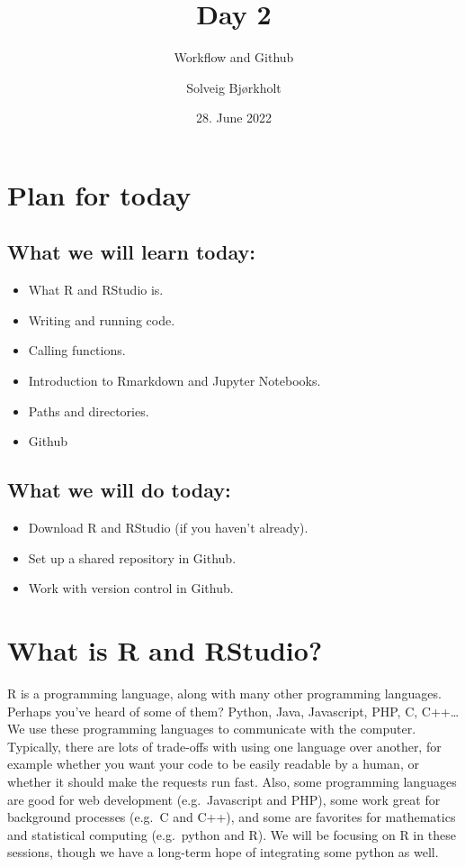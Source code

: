 \documentclass[
]{article}
\title{Day 2}
\subtitle{Workflow and Github}
\author{Solveig Bjørkholt}
\date{28. June 2022}
\providecommand{\tightlist}{%
  \setlength{\itemsep}{0pt}\setlength{\parskip}{0pt}}
\begin{document}
\maketitle

\hypertarget{plan-for-today}{%
\section{Plan for today}\label{plan-for-today}}

\hypertarget{what-we-will-learn-today}{%
\subsection{What we will learn today:}\label{what-we-will-learn-today}}

\begin{itemize}
\tightlist
\item
  What R and RStudio is.
\item
  Writing and running code.
\item
  Calling functions.
\item
  Introduction to Rmarkdown and Jupyter Notebooks.
\item
  Paths and directories.
\item
  Github
\end{itemize}

\hypertarget{what-we-will-do-today}{%
\subsection{What we will do today:}\label{what-we-will-do-today}}

\begin{itemize}
\tightlist
\item
  Download R and RStudio (if you haven't already).
\item
  Set up a shared repository in Github.
\item
  Work with version control in Github.
\end{itemize}

\hypertarget{what-is-r-and-rstudio}{%
\section{What is R and RStudio?}\label{what-is-r-and-rstudio}}

R is a programming language, along with many other programming
languages. Perhaps you've heard of some of them? Python, Java,
Javascript, PHP, C, C++\ldots{} We use these programming languages to
communicate with the computer. Typically, there are lots of trade-offs
with using one language over another, for example whether you want your
code to be easily readable by a human, or whether it should make the
requests run fast. Also, some programming languages are good for web
development (e.g.~Javascript and PHP), some work great for background
processes (e.g.~C and C++), and some are favorites for mathematics and
statistical computing (e.g.~python and R). We will be focusing on R in
these sessions, though we have a long-term hope of integrating some
python as well.
\end{document}
